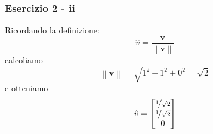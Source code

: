 \documentclass{beamer}
\newcommand{\norm}[1]{\left\lVert#1\right\rVert}
\begin{document}
\begin{frame}
\frametitle{ Esercizio 2 - ii}
Ricordando la definizione:
    \begin{equation*}
    \hat{v} = \frac{\mathbf{v}}{\norm{\mathbf{v}}}
    \end{equation*}
calcoliamo
    \begin{equation*}
    \norm{\mathbf{v}} = \sqrt{1^2 + 1^2 + 0^2} = \sqrt{2}
    \end{equation*}
e otteniamo
\begin{displaymath}
\hat{v} =  \begin{bmatrix}
    \nicefrac{1}{\sqrt{2}}\\
    \nicefrac{1}{\sqrt{2}}\\
                0
                \end{bmatrix}
\end{displaymath}
\end{frame}
\end{document}

